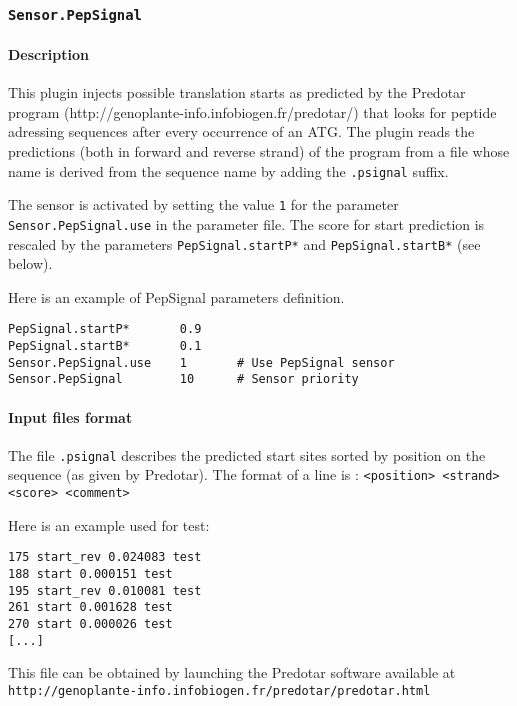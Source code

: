 
\subsubsection{\texttt{Sensor.PepSignal}}


\paragraph{Description}
This plugin injects possible translation starts as predicted by the Predotar
 program (http://genoplante-info.infobiogen.fr/predotar/) that looks for 
peptide adressing sequences after every occurrence of an ATG. The plugin reads 
the predictions (both in forward and reverse strand) of the program 
from a file whose name is derived 
from the sequence name by adding the \texttt{.psignal} suffix.

The sensor is activated by setting the value \texttt{1} for the parameter
\texttt{Sensor.PepSignal.use} in the parameter file. The score for start
 prediction is rescaled by the parameters {\tt PepSignal.startP*} and
{\tt PepSignal.startB*} (see below).

Here is an example of PepSignal parameters definition.
\begin{Verbatim}[fontsize=\small]
PepSignal.startP*       0.9
PepSignal.startB*       0.1
Sensor.PepSignal.use    1       # Use PepSignal sensor	
Sensor.PepSignal        10      # Sensor priority
\end{Verbatim}


\paragraph{Input files format}

The file \texttt{.psignal} describes the predicted start sites
sorted by position on the sequence (as given by Predotar).
The format of a line is : \texttt{<position> <strand> <score> <comment>}

Here is an example used for test:
\begin{Verbatim}[fontsize=\small]
175 start_rev 0.024083 test
188 start 0.000151 test
195 start_rev 0.010081 test
261 start 0.001628 test
270 start 0.000026 test
[...]
\end{Verbatim}

This file can be obtained by launching the Predotar software
available at\\
\texttt{http://genoplante-info.infobiogen.fr/predotar/predotar.html}


